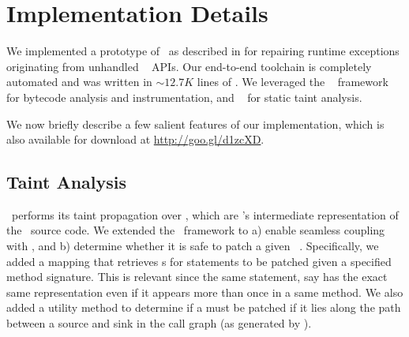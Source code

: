 \chapter{Implementation Details}
\label{chapter:iimplementation}

We implemented a prototype of \tool\ as described in  for
repairing runtime exceptions originating from unhandled \java\ 
APIs. Our end-to-end toolchain is completely automated and was written in
$\sim$$12.7K$ lines of \java. We leveraged the \soot~\cite{soot} framework for
bytecode analysis and instrumentation, and \infoflow~\cite{infoflow} for static
taint analysis.

% 
% 
We now briefly describe a few salient features of our implementation, which is
also available for download at \url{http://goo.gl/d1zcXD}.

\section{Taint Analysis}

\infoflow\ performs its taint propagation over , which are \soot's
intermediate representation of the \java\ source code. We extended the
\infoflow\ framework to a) enable seamless coupling with \soot, and b) determine
whether it is safe to patch a given \soot\ . Specifically, we added
a mapping that retrieves s for statements to be patched given a
specified method signature. This is relevant since the same statement, say
 has the exact same representation even if it appears more
than once in a same method. We also added a utility method to determine if a
 must be patched if it lies along the path between a source and sink 
in the call graph (as generated by \soot).


